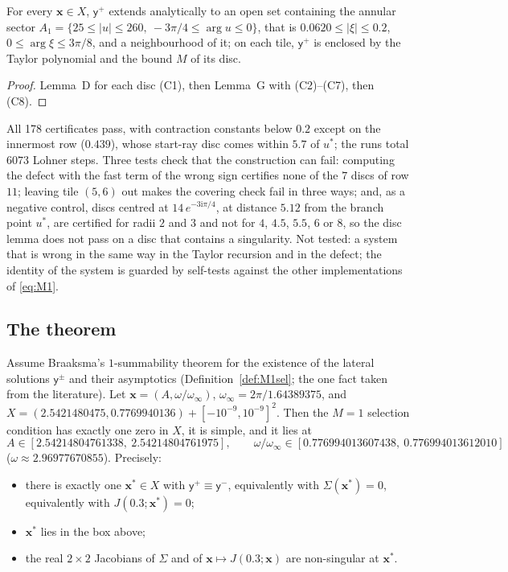 \documentclass{amsart}
\numberwithin{equation}{section}
\theoremstyle{plain}
\newenvironment{thmnamed}[1]{\renewcommand\theinnerthm{#1}\innerthm}{\endinnerthm}
\newenvironment{lemnamed}[1]{\renewcommand\theinnerlem{#1}\innerlem}{\endinnerlem}
\theoremstyle{definition}
\theoremstyle{remark}
\newcommand{\winf}{\omega_\infty}
\newcommand{\bx}{\mathbf{x}}
\newcommand{\iu}{\mathrm{i}}
\begin{document}
\begin{lemnamed}{6b$_1$}\label{lem:6b1}
For every $\bx \in X$, $\mathsf y^+$ extends analytically to an open set containing the annular sector
$A_1 = \{25 \le |u| \le 260,\ -3\pi/4 \le \arg u \le 0\}$, that is $0.0620 \le |\xi| \le 0.2$, $0 \le \arg\xi \le 3\pi/8$, and a neighbourhood of
it; on each tile, $\mathsf y^+$ is enclosed by the Taylor polynomial and the bound $M$ of its disc.
\end{lemnamed}

\begin{proof}
Lemma~D for each disc (C1), then Lemma~G with (C2)--(C7), then (C8).
\end{proof}

All 178 certificates pass, with contraction constants below $0.2$ except on the innermost row ($0.439$), whose start-ray disc
comes within $5.7$ of $u^*$; the runs total $6073$ Lohner steps. Three tests check that the construction can fail: computing the
defect with the fast term of the wrong sign certifies none of the $7$ discs of row $11$; leaving tile $(5,6)$ out makes the
covering check fail in three ways; and, as a negative control, discs centred at $14\,e^{-3\iu\pi/4}$, at distance $5.12$ from the
branch point $u^*$, are certified for radii $2$ and $3$ and not for $4$, $4.5$, $5.5$, $6$ or $8$, so the disc lemma does not pass on a
disc that contains a singularity. Not tested: a system that is wrong in the same way in the Taylor recursion and in the
defect; the identity of the system is guarded by self-tests against the other implementations of \eqref{eq:M1}.

\subsection{The theorem}

\begin{thmnamed}{A($M = 1$)}\label{thm:A}
Assume Braaksma's $1$-summability theorem for the existence of the lateral solutions $\mathsf y^\pm$ and their asymptotics
(Definition~\ref{def:M1sel}; the one fact taken from the literature). Let $\bx = (A, \omega/\winf)$, $\winf = 2\pi/1.64389375$, and
$X = (2.5421480475, 0.7769940136) + [-10^{-9}, 10^{-9}]^2$. Then the $M = 1$ selection condition has exactly one zero in $X$, it is
simple, and it lies at
\[
A \in [2.54214804761338,\ 2.54214804761975], \qquad \omega/\winf \in [0.776994013607438,\ 0.776994013612010]
\]
($\omega \approx 2.96977670855$). Precisely:
\begin{itemize}
\item there is exactly one $\bx^* \in X$ with $\mathsf y^+ \equiv \mathsf y^-$, equivalently with $\Sigma(\bx^*) = 0$, equivalently with
$J(0.3; \bx^*) = 0$;
\item $\bx^*$ lies in the box above;
\item the real $2\times2$ Jacobians of $\Sigma$ and of $\bx \mapsto J(0.3; \bx)$ are non-singular at $\bx^*$.
\end{itemize}
\end{thmnamed}
\end{document}
